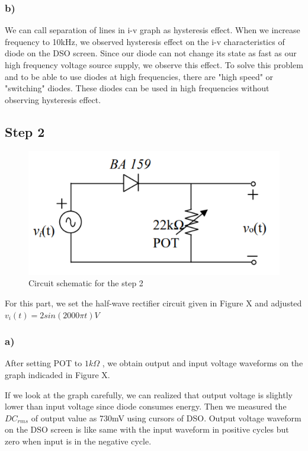 \documentclass[letterpaper,12pt]{article}
\begin{document}
\subsubsection{b)}


We can call separation of lines in i-v graph as hysteresis effect. When we increase frequency to 10kHz, we observed hysteresis effect on the i-v characteristics of diode on the DSO screen. Since our diode can not change its state as fast as our high frequency voltage source supply, we observe this effect. To solve this problem and to be able to use diodes at high frequencies, there are "high speed" or "switching" diodes. These diodes can be used in high frequencies without observing hysteresis effect.

\subsection{Step 2}

\begin{figure}[H]
    \centering
    \includegraphics[width=1\textwidth]{2_1.png}
    \caption{Circuit schematic for the step 2}
\end{figure} 
For this part, we set the half-wave rectifier circuit given in Figure X and adjusted 
\(
v_i(t)  = 2sin(2000 \pi t) V 
\)


\subsubsection{a)}
After setting POT to \(1k\Omega\) , we obtain output and input voltage waveforms on the graph indicaded in Figure X.


If we look at the graph carefully, we can realized that output voltage is slightly lower than input voltage since diode consumes energy. Then we measured the \(DC_{rms} \) of output value as 730mV using cursors of DSO. Output voltage waveform on the DSO screen is like same with the input waveform in positive cycles but zero when input is in the negative cycle.  
\end{document}
